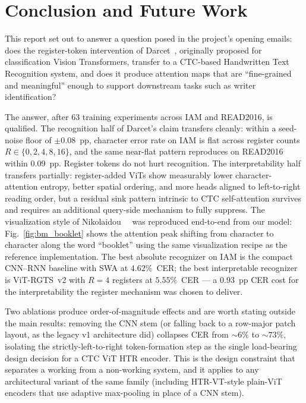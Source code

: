 \section{Conclusion and Future Work}
\label{sec:conclusion}

This report set out to answer a question posed in the project's opening emails: does the register-token intervention of Darcet~\etal, originally proposed for classification Vision Transformers, transfer to a CTC-based Handwritten Text Recognition system, and does it produce attention maps that are ``fine-grained and meaningful'' enough to support downstream tasks such as writer identification?

The answer, after $63$ training experiments across IAM and READ2016, is qualified. The recognition half of Darcet's claim transfers cleanly: within a seed-noise floor of $\pm 0.08$~pp, character error rate on IAM is flat across register counts $R \in \{0, 2, 4, 8, 16\}$, and the same near-flat pattern reproduces on READ2016 within $0.09$~pp. Register tokens do not hurt recognition. The interpretability half transfers partially: register-added ViTs show measurably lower character-attention entropy, better spatial ordering, and more heads aligned to left-to-right reading order, but a residual sink pattern intrinsic to CTC self-attention survives and requires an additional query-side mechanism to fully suppress. The visualization style of Nikolaidou~\etal~\cite{nikolaidou2024beyondmem} was reproduced end-to-end from our model: Fig.~\ref{fig:bm_booklet} shows the attention peak shifting from character to character along the word ``booklet'' using the same visualization recipe as the reference implementation. The best absolute recognizer on IAM is the compact CNN--RNN baseline with SWA at $4.62\%$~CER; the best interpretable recognizer is ViT-RGTS~v2 with $R = 4$ registers at $5.55\%$~CER --- a $0.93$~pp CER cost for the interpretability the register mechanism was chosen to deliver.

Two ablations produce order-of-magnitude effects and are worth stating outside the main results: removing the CNN stem (or falling back to a row-major patch layout, as the legacy v1 architecture did) collapses CER from $\sim\!6\%$ to $\sim\!73\%$, isolating the strictly-left-to-right token-formation step as the single load-bearing design decision for a CTC ViT HTR encoder. This is the design constraint that separates a working from a non-working system, and it applies to any architectural variant of the same family (including HTR-VT-style plain-ViT encoders that use adaptive max-pooling in place of a CNN stem).

